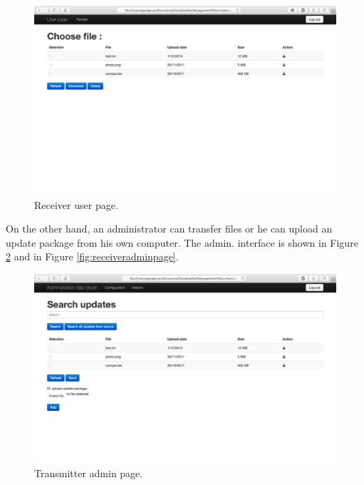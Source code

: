 \documentclass[a4paper,10pt]{article}
\begin{document}
\begin{figure}[!h]
\centering
\includegraphics[scale=0.35]{images/userreceiver.png}
\caption{Receiver user page.}
\label{fig:receiveruserpage}
\end{figure}

On the other hand, an administrator can transfer files or he can upload an update package from his own computer. The admin. interface is shown in Figure \ref{fig:transadminpage}
and in Figure \ref{fig:receiveradminpage}.
\begin{figure}[!h]
\centering
\includegraphics[scale=0.35]{images/admintransmitter.png}
\caption{Transmitter admin page.}
\label{fig:transadminpage}
\end{figure}
\end{document}
